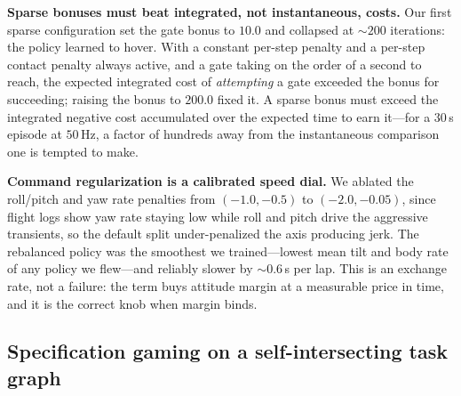\documentclass[10pt, twocolumn]{article}
\begin{document}
\textbf{Sparse bonuses must beat integrated, not instantaneous, costs.} Our
first sparse configuration set the gate bonus to $10.0$ and collapsed at
${\sim}200$ iterations: the policy learned to hover. With a constant per-step
penalty and a per-step contact penalty always active, and a gate taking on the
order of a second to reach, the expected integrated cost of \emph{attempting} a
gate exceeded the bonus for succeeding; raising the bonus to $200.0$ fixed it.
A sparse bonus must exceed the integrated negative cost accumulated over the
expected time to earn it---for a $30$\,s episode at $50$\,Hz, a factor of
hundreds away from the instantaneous comparison one is tempted to make.

\textbf{Command regularization is a calibrated speed dial.} We ablated the
roll/pitch and yaw rate penalties from $(-1.0,-0.5)$ to $(-2.0,-0.05)$, since
flight logs show yaw rate staying low while roll and pitch drive the aggressive
transients, so the default split under-penalized the axis producing jerk. The
rebalanced policy was the smoothest we trained---lowest mean tilt and body rate
of any policy we flew---and reliably slower by ${\sim}0.6$\,s per lap. This is
an exchange rate, not a failure: the term buys attitude margin at a measurable
price in time, and it is the correct knob when margin binds.

\subsection{Specification gaming on a self-intersecting task graph}
\label{sec:hacking}
\end{document}

